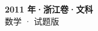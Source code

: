 \documentclass[zihao=-4, a4paper]{ctexart}
\begin{document}
\begin{center}
  {\Large\bfseries 2011 年·浙江卷·文科}\\[4pt]
  {\large 数学 · 试题版}
\end{center}
\medskip
{}

\end{document}
